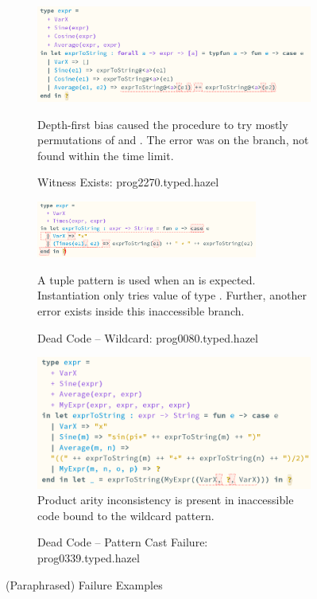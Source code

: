 \begin{figure}[h]
\centering
\begin{subfigure}{1\textwidth}
\includegraphics[width=1\textwidth]{Media/Figures/witness_exists}

Depth-first bias caused the procedure to try mostly permutations of  and . The error was on the  branch, not found within the time limit.
\caption{Witness Exists: prog2270.typed.hazel}
\end{subfigure}

\begin{subfigure}{1\textwidth}
\includegraphics[width=0.8\textwidth]{Media/Figures/dead_code_pattern_instantiation}

A tuple pattern is used when an  is expected. Instantiation only tries value of type . Further, another error exists inside this inaccessible branch.
\caption{Dead Code -- Wildcard: prog0080.typed.hazel}
\end{subfigure}

\begin{subfigure}{0.7\textwidth}
\includegraphics[width=1\textwidth]{Media/Figures/dead_code_wildcard}
Product arity inconsistency is present in inaccessible code bound to the wildcard pattern.
\caption{Dead Code -- Pattern Cast Failure: prog0339.typed.hazel}
\end{subfigure}
\caption{(Paraphrased) Failure Examples}
\label{fig:FailureExamples}
\end{figure}